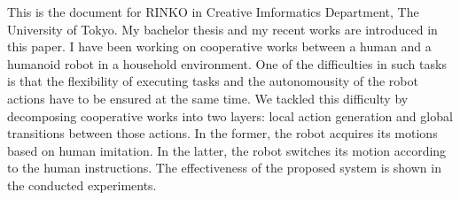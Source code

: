 This is the document for RINKO in Creative Imformatics Department, The University of Tokyo. My bachelor thesis and my recent works are introduced in this paper. I have been working on cooperative works between a human and a humanoid robot in a household environment. One of the difficulties in such tasks is that the flexibility of executing tasks and the autonomousity of the robot actions have to be ensured at the same time. We tackled this difficulty by decomposing cooperative works into two layers: local action generation and global transitions between those actions. In the former, the robot acquires its motions based on human imitation. In the latter, the robot switches its motion according to the human instructions. The effectiveness of the proposed system is shown in the conducted experiments.



